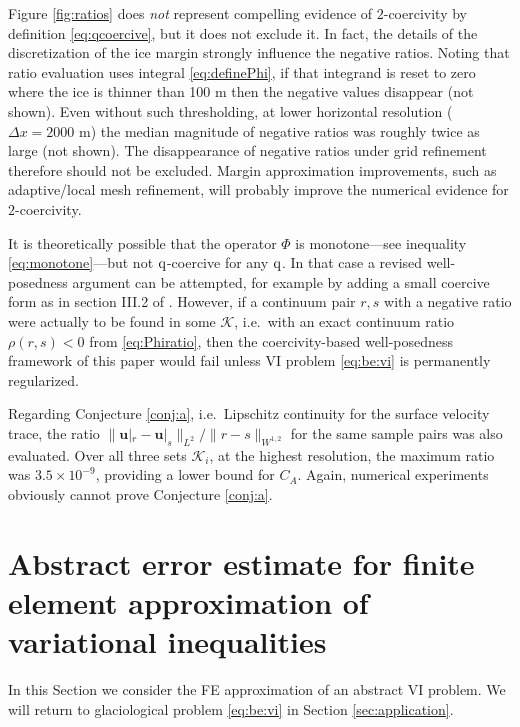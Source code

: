 \documentclass[hidelinks,onefignum,onetabnum,final]{siamart220329}  %
\newcommand{\bu}{\mathbf{u}}
\newcommand{\cK}{\mathcal{K}}
\newcommand{\qq}{{\text{\textnormal{q}}}}
\begin{document}
Figure \ref{fig:ratios} does \emph{not} represent compelling evidence of $2$-coercivity by definition \eqref{eq:qcoercive}, but it does not exclude it.  In fact, the details of the discretization of the ice margin strongly influence the negative ratios.  Noting that ratio evaluation uses integral \eqref{eq:definePhi}, if that integrand is reset to zero where the ice is thinner than 100 m then the negative values disappear (not shown).  Even without such thresholding, at lower horizontal resolution ($\Delta x=2000$ m) the median magnitude of negative ratios was roughly twice as large (not shown).  The disappearance of negative ratios under grid refinement therefore should not be excluded.  Margin approximation improvements, such as adaptive/local mesh refinement, will probably improve the numerical evidence for $2$-coercivity.

It is theoretically possible that the operator $\Phi$ is monotone---see inequality \eqref{eq:monotone}---but not $\qq$-coercive for any $\qq$.  In that case a revised well-posedness argument can be attempted, for example by adding a small coercive form as in section III.2 of \cite{KinderlehrerStampacchia1980}.  However, if a continuum pair $r,s$ with a negative ratio were actually to be found in some $\cK$, i.e.~with an exact continuum ratio $\rho(r,s)<0$ from \eqref{eq:Phiratio}, then the coercivity-based well-posedness framework of this paper would fail unless VI problem \eqref{eq:be:vi} is permanently regularized.

Regarding Conjecture \ref{conj:a}, i.e.~Lipschitz continuity for the surface velocity trace, the ratio $\big\|\bu|_r - \bu|_s\big\|_{L^2}/\|r-s\|_{W^{1,2}}$ for the same sample pairs was also evaluated.  Over all three sets $\cK_i$, at the highest resolution, the maximum ratio was $3.5\times 10^{-9}$, providing a lower bound for $C_A$.  Again, numerical experiments obviously cannot prove Conjecture \ref{conj:a}.


\section{Abstract error estimate for finite element approximation of variational inequalities} \label{sec:abstractestimate}

In this Section we consider the FE approximation of an abstract VI problem.  We will return to glaciological problem \eqref{eq:be:vi} in Section \ref{sec:application}.
\end{document}

